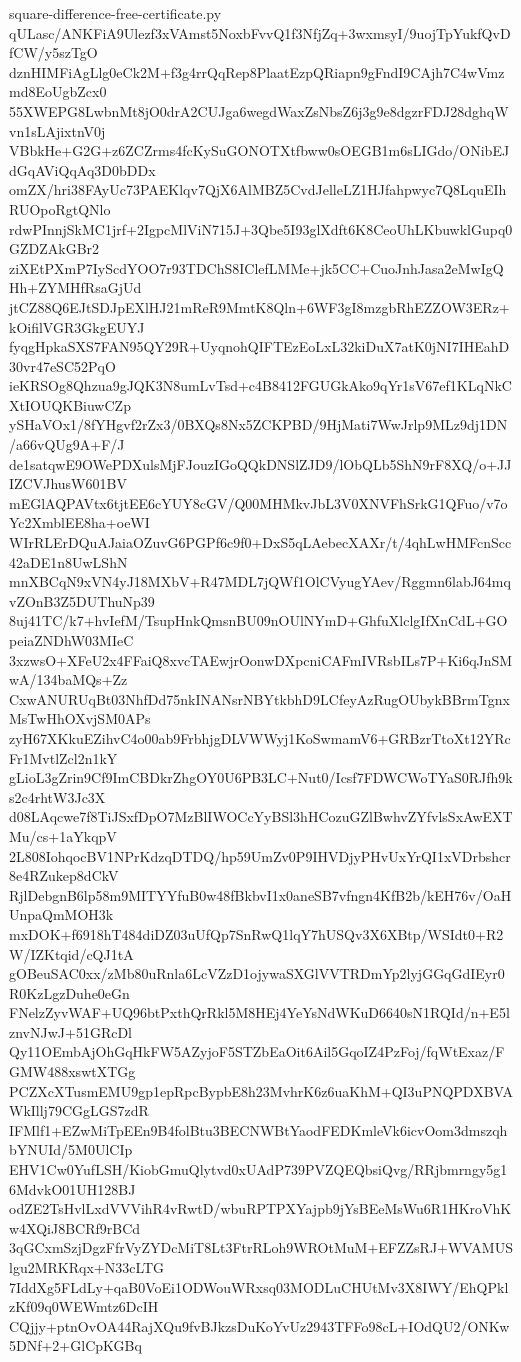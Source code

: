 \documentclass[11pt]{article}
\theoremstyle{definition}
\theoremstyle{remark}
\begin{document}
\begin{filecontents*}[overwrite]{square-difference-free-certificate.py}
qULasc/ANKFiA9Ulezf3xVAmst5NoxbFvvQ1f3NfjZq+3wxmsyI/9uojTpYukfQvDfCW/y5szTgO
dznHIMFiAgLlg0eCk2M+f3g4rrQqRep8PlaatEzpQRiapn9gFndI9CAjh7C4wVmzmd8EoUgbZcx0
55XWEPG8LwbnMt8jO0drA2CUJga6wegdWaxZsNbsZ6j3g9e8dgzrFDJ28dghqWvn1sLAjixtnV0j
VBbkHe+G2G+z6ZCZrms4fcKySuGONOTXtfbww0sOEGB1m6sLIGdo/ONibEJdGqAViQqAq3D0bDDx
omZX/hri38FAyUc73PAEKlqv7QjX6AlMBZ5CvdJelleLZ1HJfahpwyc7Q8LquEIhRUOpoRgtQNlo
rdwPInnjSkMC1jrf+2IgpcMlViN715J+3Qbe5I93glXdft6K8CeoUhLKbuwklGupq0GZDZAkGBr2
ziXEtPXmP7IyScdYOO7r93TDChS8IClefLMMe+jk5CC+CuoJnhJasa2eMwIgQHh+ZYMHfRsaGjUd
jtCZ88Q6EJtSDJpEXlHJ21mReR9MmtK8Qln+6WF3gI8mzgbRhEZZOW3ERz+kOifilVGR3GkgEUYJ
fyqgHpkaSXS7FAN95QY29R+UyqnohQIFTEzEoLxL32kiDuX7atK0jNI7IHEahD30vr47eSC52PqO
ieKRSOg8Qhzua9gJQK3N8umLvTsd+c4B8412FGUGkAko9qYr1sV67ef1KLqNkCXtIOUQKBiuwCZp
ySHaVOx1/8fYHgvf2rZx3/0BXQs8Nx5ZCKPBD/9HjMati7WwJrlp9MLz9dj1DN/a66vQUg9A+F/J
de1satqwE9OWePDXulsMjFJouzIGoQQkDNSlZJD9/lObQLb5ShN9rF8XQ/o+JJIZCVJhusW601BV
mEGlAQPAVtx6tjtEE6cYUY8cGV/Q00MHMkvJbL3V0XNVFhSrkG1QFuo/v7oYc2XmblEE8ha+oeWI
WIrRLErDQuAJaiaOZuvG6PGPf6c9f0+DxS5qLAebecXAXr/t/4qhLwHMFcnScc42aDE1n8UwLShN
mnXBCqN9xVN4yJ18MXbV+R47MDL7jQWf1OlCVyugYAev/Rggmn6labJ64mqvZOnB3Z5DUThuNp39
8uj41TC/k7+hvIefM/TsupHnkQmsnBU09nOUlNYmD+GhfuXlclgIfXnCdL+GOpeiaZNDhW03MIeC
3xzwsO+XFeU2x4FFaiQ8xvcTAEwjrOonwDXpcniCAFmIVRsbILs7P+Ki6qJnSMwA/134baMQs+Zz
CxwANURUqBt03NhfDd75nkINANsrNBYtkbhD9LCfeyAzRugOUbykBBrmTgnxMsTwHhOXvjSM0APs
zyH67XKkuEZihvC4o00ab9FrbhjgDLVWWyj1KoSwmamV6+GRBzrTtoXt12YRcFr1MvtlZcl2n1kY
gLioL3gZrin9Cf9ImCBDkrZhgOY0U6PB3LC+Nut0/Icsf7FDWCWoTYaS0RJfh9ks2c4rhtW3Jc3X
d08LAqcwe7f8TiJSxfDpO7MzBlIWOCcYyBSl3hHCozuGZlBwhvZYfvlsSxAwEXTMu/cs+1aYkqpV
2L808IohqocBV1NPrKdzqDTDQ/hp59UmZv0P9IHVDjyPHvUxYrQI1xVDrbshcr8e4RZukep8dCkV
RjlDebgnB6lp58m9MITYYfuB0w48fBkbvI1x0aneSB7vfngn4KfB2b/kEH76v/OaHUnpaQmMOH3k
mxDOK+f6918hT484diDZ03uUfQp7SnRwQ1lqY7hUSQv3X6XBtp/WSIdt0+R2W/IZKtqid/cQJ1tA
gOBeuSAC0xx/zMb80uRnla6LcVZzD1ojywaSXGlVVTRDmYp2lyjGGqGdIEyr0R0KzLgzDuhe0eGn
FNelzZyvWAF+UQ96btPxthQrRkl5M8HEj4YeYsNdWKuD6640sN1RQId/n+E5lznvNJwJ+51GRcDl
Qy11OEmbAjOhGqHkFW5AZyjoF5STZbEaOit6Ail5GqoIZ4PzFoj/fqWtExaz/FGMW488xswtXTGg
PCZXcXTusmEMU9gp1epRpcBypbE8h23MvhrK6z6uaKhM+QI3uPNQPDXBVAWkIllj79CGgLGS7zdR
IFMlf1+EZwMiTpEEn9B4folBtu3BECNWBtYaodFEDKmleVk6icvOom3dmszqhbYNUId/5M0UlCIp
EHV1Cw0YufLSH/KiobGmuQlytvd0xUAdP739PVZQEQbsiQvg/RRjbmrngy5g16MdvkO01UH128BJ
odZE2TsHvlLxdVVVihR4vRwtD/wbuRPTPXYajpb9jYsBEeMsWu6R1HKroVhKw4XQiJ8BCRf9rBCd
3qGCxmSzjDgzFfrVyZYDcMiT8Lt3FtrRLoh9WROtMuM+EFZZsRJ+WVAMUSlgu2MRKRqx+N33cLTG
7IddXg5FLdLy+qaB0VoEi1ODWouWRxsq03MODLuCHUtMv3X8IWY/EhQPklzKf09q0WEWmtz6DcIH
CQjjy+ptnOvOA44RajXQu9fvBJkzsDuKoYvUz2943TFFo98cL+IOdQU2/ONKw5DNf+2+GlCpKGBq

\end{filecontents*}
\end{document}
